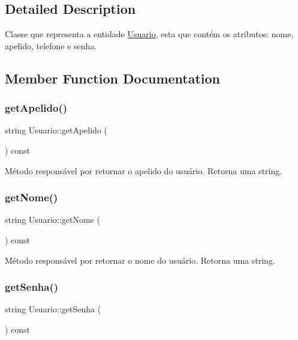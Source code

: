 \subsection{Detailed Description}
Classe que representa a entidade \hyperlink{classUsuario}{Usuario}, esta que contém os atributos\+: nome, apelido, telefone e senha. 

\subsection{Member Function Documentation}
\mbox{\label{classUsuario_a78d374a50eed8b7ceeec4b874ba154d4}} 
\subsubsection{\texorpdfstring{get\+Apelido()}{getApelido()}}
{\footnotesize\ttfamily string Usuario\+::get\+Apelido (\begin{DoxyParamCaption}{ }\end{DoxyParamCaption}) const\hspace{0.3cm}{\ttfamily [inline]}}

Método responsável por retornar o apelido do usuário. Retorna uma string. \mbox{\label{classUsuario_a6aeb8cccd96e84aedeb50a68b4f9a3d4}} 
\subsubsection{\texorpdfstring{get\+Nome()}{getNome()}}
{\footnotesize\ttfamily string Usuario\+::get\+Nome (\begin{DoxyParamCaption}{ }\end{DoxyParamCaption}) const\hspace{0.3cm}{\ttfamily [inline]}}

Método responsável por retornar o nome do usuário. Retorna uma string. \mbox{\label{classUsuario_a5a6149716b03d4b1408aaa6a0dc4bb32}} 
\subsubsection{\texorpdfstring{get\+Senha()}{getSenha()}}
{\footnotesize\ttfamily string Usuario\+::get\+Senha (\begin{DoxyParamCaption}{ }\end{DoxyParamCaption}) const\hspace{0.3cm}{\ttfamily [inline]}}


